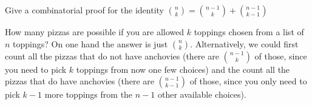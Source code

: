 \begin{squestions}

  \begin{answer}
  \end{answer}


\question Give a combinatorial proof for the identity ${n\choose k} = {n-1 \choose k} + {n-1 \choose k-1}$
  
  \begin{answer}
    How many pizzas are possible if you are allowed $k$ toppings chosen from a list of $n$ toppings?  On one hand the answer is just ${n \choose k}$.  Alternatively, we could first count all the pizzas that do not have anchovies (there are ${n-1 \choose k}$ of those, since you need to pick $k$ toppings from now one few choices) and the count all the pizzas that do have anchovies (there are ${n-1 \choose k-1}$ of those, since you only need to pick $k-1$ more toppings from the $n-1$ other available choices).
  \end{answer}










\end{squestions}
